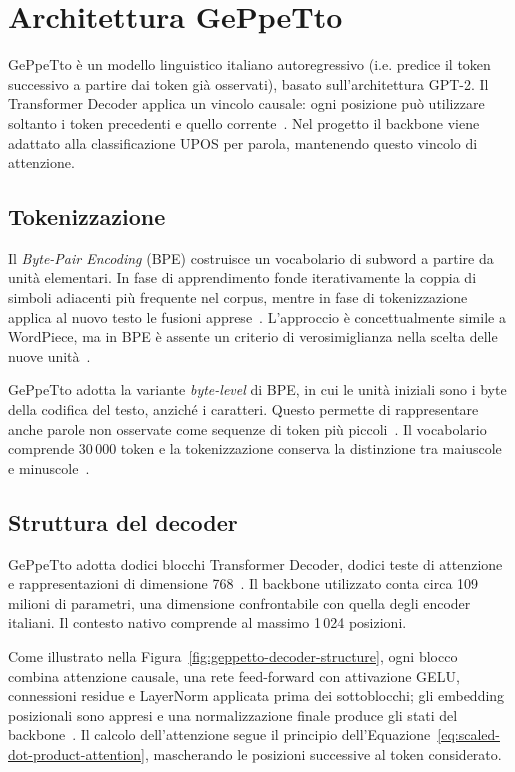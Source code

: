 \documentclass[12pt,a4paper]{report}
\begin{document}
\section{Architettura GePpeTto}
\label{sec:geppetto-architecture}

GePpeTto è un modello linguistico italiano autoregressivo (i.e. predice il token successivo a partire dai token già osservati), basato sull'architettura GPT-2. Il Transformer Decoder applica un vincolo causale: ogni posizione può utilizzare soltanto i token precedenti e quello corrente~\cite{geppetto2020,gpt22019}. Nel progetto il backbone viene adattato alla classificazione UPOS per parola, mantenendo questo vincolo di attenzione.

\subsection{Tokenizzazione}
\label{subsec:geppetto-tokenization}

Il \emph{Byte-Pair Encoding} (BPE) costruisce un vocabolario di subword a partire da unità elementari. In fase di apprendimento fonde iterativamente la coppia di simboli adiacenti più frequente nel corpus, mentre in fase di tokenizzazione applica al nuovo testo le fusioni apprese~\cite{sennrich2016}. L'approccio è concettualmente simile a WordPiece, ma in BPE è assente un criterio di verosimiglianza nella scelta delle nuove unità~\cite{wu2016gnmt}.

GePpeTto adotta la variante \emph{byte-level} di BPE, in cui le unità iniziali sono i byte della codifica del testo, anziché i caratteri. Questo permette di rappresentare anche parole non osservate come sequenze di token più piccoli~\cite{gpt22019,hfgpt2}. Il vocabolario comprende 30\,000 token e la tokenizzazione conserva la distinzione tra maiuscole e minuscole~\cite{geppettomodel}.

\subsection{Struttura del decoder}
\label{subsec:geppetto-decoder-structure}

GePpeTto adotta dodici blocchi Transformer Decoder, dodici teste di attenzione e rappresentazioni di dimensione 768~\cite{geppettomodel,gpt22019}. Il backbone utilizzato conta circa 109 milioni di parametri, una dimensione confrontabile con quella degli encoder italiani. Il contesto nativo comprende al massimo 1\,024 posizioni.

Come illustrato nella Figura~\ref{fig:geppetto-decoder-structure}, ogni blocco combina attenzione causale, una rete feed-forward con attivazione GELU, connessioni residue e LayerNorm applicata prima dei sottoblocchi; gli embedding posizionali sono appresi e una normalizzazione finale produce gli stati del backbone~\cite{gpt22019,hfgpt2}. Il calcolo dell'attenzione segue il principio dell'Equazione~\ref{eq:scaled-dot-product-attention}, mascherando le posizioni successive al token considerato.
\end{document}
